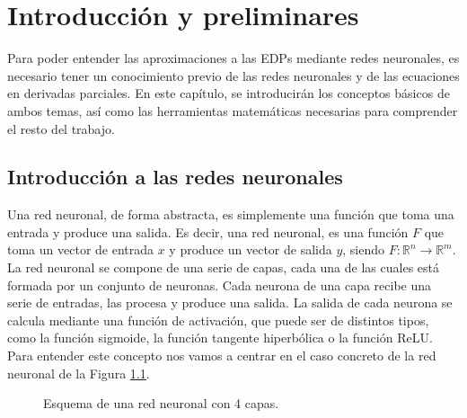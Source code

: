 \documentclass[a4paper,11pt,spanish, twoside, leqno]{tfg-uam}
\theoremstyle{definition}
\begin{document}
\chapter{Introducción y preliminares}\label{chap1}
\setcounter{page}{1}
Para poder entender las aproximaciones a las EDPs mediante redes neuronales, es necesario tener un conocimiento previo de las redes neuronales y de las ecuaciones en derivadas parciales. En este capítulo, se introducirán los conceptos básicos de ambos temas, así como las herramientas matemáticas necesarias para comprender el resto del trabajo.

\section{Introducción a las redes neuronales}\label{sec:RedesNeuronales}
Una red neuronal, de forma abstracta, es simplemente una función que toma una entrada y produce una salida. Es decir, una red neuronal, es una función $F$ que toma un vector de entrada $x$ y produce un vector de salida $y$, siendo $F: \mathbb{R}^n \rightarrow \mathbb{R}^m$. La red neuronal se compone de una serie de capas, cada una de las cuales está formada por un conjunto de neuronas. Cada neurona de una capa recibe una serie de entradas, las procesa y produce una salida. La salida de cada neurona se calcula mediante una función de activación, que puede ser de distintos tipos, como la función sigmoide, la función tangente hiperbólica o la función ReLU. Para entender este concepto nos vamos a centrar en el caso concreto de la red neuronal de la Figura \ref{fig:RedNeuronal}.


\begin{figure}
    \centering
    \caption{Esquema de una red neuronal con 4 capas.}
    \label{fig:RedNeuronal}
\end{figure}
\end{document}
